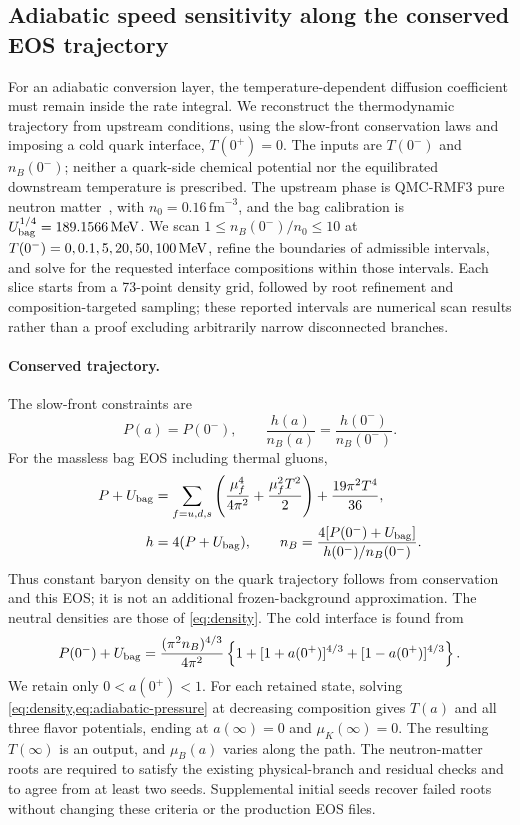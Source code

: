 \subsection{Adiabatic speed sensitivity along the conserved EOS trajectory}
\label{sec:adiabatic-sensitivity}
For an adiabatic conversion layer, the temperature-dependent diffusion coefficient must remain inside the rate integral.
We reconstruct the thermodynamic trajectory from upstream conditions, using the slow-front conservation laws and imposing a cold quark interface, \(T(0^+)=0\).
The inputs are \(T(0^-)\) and \(n_B(0^-)\); neither a quark-side chemical potential nor the equilibrated downstream temperature is prescribed.
The upstream phase is QMC-RMF3 pure neutron matter~\cite{Alford:2022bpp,Alford:2023rgp}, with \(n_0=0.16\,\mathrm{fm}^{-3}\), and the bag calibration is \(U_{\rm bag}^{1/4}=189.1566\,\mathrm{MeV}\).
We scan \(1\le n_B(0^-)/n_0\le10\) at \(T(0^-)=0,0.1,5,20,50,100\,\mathrm{MeV}\), refine the boundaries of admissible intervals, and solve for the requested interface compositions within those intervals.
Each slice starts from a 73-point density grid, followed by root refinement and composition-targeted sampling; these reported intervals are numerical scan results rather than a proof excluding arbitrarily narrow disconnected branches.

\paragraph{Conserved trajectory.}
The slow-front constraints are
\begin{equation}
 P(a)=P(0^-),\qquad
 \frac{h(a)}{n_B(a)}=\frac{h(0^-)}{n_B(0^-)}.
 \label{eq:adiabatic-conservation}
\end{equation}
For the massless bag EOS including thermal gluons,
\begin{align}
 P+U_{\rm bag}
 &=\sum_{f=u,d,s}\left(\frac{\mu_f^4}{4\pi^2}+\frac{\mu_f^2T^2}{2}\right)
   +\frac{19\pi^2T^4}{36},\label{eq:adiabatic-pressure}\\
 h&=4(P+U_{\rm bag}),\qquad
 n_B=\frac{4[P(0^-)+U_{\rm bag}]}{h(0^-)/n_B(0^-)}.
 \label{eq:adiabatic-density}
\end{align}
Thus constant baryon density on the quark trajectory follows from conservation and this EOS; it is not an additional frozen-background approximation.
The neutral densities are those of \cref{eq:density}.
The cold interface is found from
\begin{equation}
 P(0^-)+U_{\rm bag}
 =\frac{(\pi^2n_B)^{4/3}}{4\pi^2}
 \left\{1+[1+a(0^+)]^{4/3}+[1-a(0^+)]^{4/3}\right\}.
 \label{eq:adiabatic-cold-interface}
\end{equation}
We retain only \(0<a(0^+)<1\).
For each retained state, solving \cref{eq:density,eq:adiabatic-pressure} at decreasing composition gives \(T(a)\) and all three flavor potentials, ending at \(a(\infty)=0\) and \(\mu_K(\infty)=0\).
The resulting \(T(\infty)\) is an output, and \(\mu_B(a)\) varies along the path.
The neutron-matter roots are required to satisfy the existing physical-branch and residual checks and to agree from at least two seeds.
Supplemental initial seeds recover failed roots without changing these criteria or the production EOS files.

